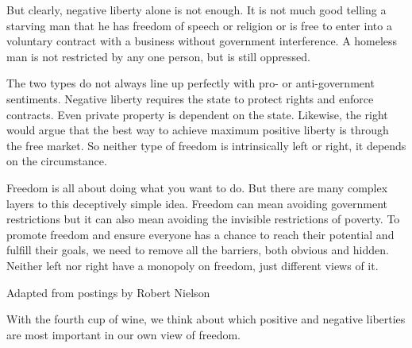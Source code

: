 {  But clearly, negative liberty alone is not enough. It is not much good telling
  a starving man that he has freedom of speech or religion or is free to enter
  into a voluntary contract with a business without government interference. A
  homeless man is not restricted by any one person, but is still oppressed.

  \newReading The two types do not always line up perfectly with pro- or
  anti-government sentiments. Negative liberty requires the state to protect
  rights and enforce contracts. Even private property is dependent on the state.
   Likewise, the right would argue that the best way to achieve maximum positive
  liberty is through the free market. So neither type of freedom is
  intrinsically left or right, it depends on the circumstance.

  Freedom is all about doing what you want to do. But there are many complex
  layers to this deceptively simple idea. Freedom can mean avoiding government
  restrictions but it can also mean avoiding the invisible restrictions of
  poverty. To promote freedom and ensure everyone has a chance to reach their
  potential and fulfill their goals, we need to remove all the barriers, both
  obvious and hidden. Neither left nor right have a monopoly on freedom, just
  different views of it.

  \textemdash{}Adapted from postings by Robert Nielson

  With the fourth cup of wine, we think about which positive and negative
  liberties are most important in our own view of freedom.

}
